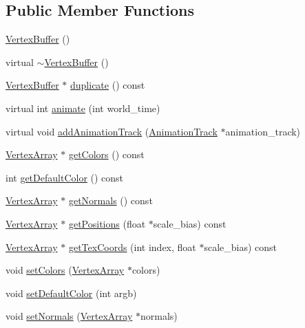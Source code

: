 \subsection*{Public Member Functions}
\begin{CompactItemize}
\item 
\hyperlink{classm3g_1_1VertexBuffer_fd7b13840c99c57d27316c8f8434dc49}{VertexBuffer} ()
\item 
virtual \hyperlink{classm3g_1_1VertexBuffer_0e5e1dbdc4295ff9aa1e15e0ce3624af}{$\sim$VertexBuffer} ()
\item 
\hyperlink{classm3g_1_1VertexBuffer}{VertexBuffer} $\ast$ \hyperlink{classm3g_1_1VertexBuffer_d069984e7455bfe074cab9497b47cadf}{duplicate} () const 
\item 
virtual int \hyperlink{classm3g_1_1VertexBuffer_8aad1ceab4c2a03609c8a42324ce484d}{animate} (int world\_\-time)
\item 
virtual void \hyperlink{classm3g_1_1VertexBuffer_415c0b110f95410ded9b85e5d99a496b}{addAnimationTrack} (\hyperlink{classm3g_1_1AnimationTrack}{AnimationTrack} $\ast$animation\_\-track)
\item 
\hyperlink{classm3g_1_1VertexArray}{VertexArray} $\ast$ \hyperlink{classm3g_1_1VertexBuffer_e3bdc8503242a6d278230352d03e5893}{getColors} () const 
\item 
int \hyperlink{classm3g_1_1VertexBuffer_4e33b93a98ce0632d51e7ae775ae5b1e}{getDefaultColor} () const 
\item 
\hyperlink{classm3g_1_1VertexArray}{VertexArray} $\ast$ \hyperlink{classm3g_1_1VertexBuffer_0f4341d1215ff8f4efeaa40a21327c0c}{getNormals} () const 
\item 
\hyperlink{classm3g_1_1VertexArray}{VertexArray} $\ast$ \hyperlink{classm3g_1_1VertexBuffer_5ca059361f9f834dd00b5d595bf3df0b}{getPositions} (float $\ast$scale\_\-bias) const 
\item 
\hyperlink{classm3g_1_1VertexArray}{VertexArray} $\ast$ \hyperlink{classm3g_1_1VertexBuffer_9015840c09da0691c31a8aab5e09404a}{getTexCoords} (int index, float $\ast$scale\_\-bias) const 
\item 
void \hyperlink{classm3g_1_1VertexBuffer_e5a5933252e3ec3afa0a83698b5b3521}{setColors} (\hyperlink{classm3g_1_1VertexArray}{VertexArray} $\ast$colors)
\item 
void \hyperlink{classm3g_1_1VertexBuffer_57fc3a141397f1287061a204c128c1b3}{setDefaultColor} (int argb)
\item 
void \hyperlink{classm3g_1_1VertexBuffer_4aabe6277538d5aa8285759dab85002a}{setNormals} (\hyperlink{classm3g_1_1VertexArray}{VertexArray} $\ast$normals)

\end{CompactItemize}
